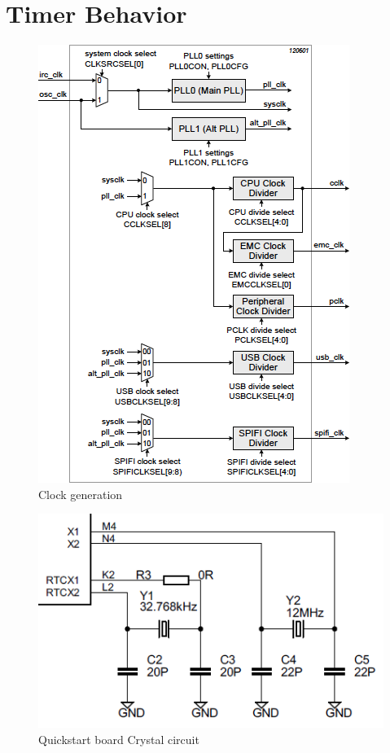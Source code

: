 \documentclass[a4paper]{tufte-handout}
\begin{document}
\section{Timer Behavior}\label{sec:timer-behavior}
\begin{figure}
\includegraphics[scale=0.65]{clock-gen}
  \caption{Clock generation}
  \label{fig:clockgeneration}
\end{figure}

\begin{figure}
  \includegraphics[scale=0.75]{qsb-xtl}
  \caption{Quickstart board Crystal circuit}
  \label{fig:externalxtl}
\end{figure}
\end{document}
